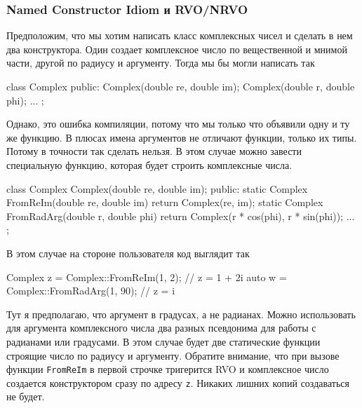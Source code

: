 \subsubsection{Named Constructor Idiom и RVO/NRVO}
\label{section::NamedCtorIdiom}

Предположим, что мы хотим написать класс комплексных чисел и сделать в нем два конструктора.
Один создает комплексное число по вещественной и мнимой части, другой по радиусу и аргументу.
Тогда мы бы могли написать так
\begin{cppcode}
class Complex {
public:
  Complex(double re, double im);
  Complex(double r, double phi);
  ...
};
\end{cppcode}
Однако, это ошибка компиляции, потому что мы только что объявили одну и ту же функцию.
В плюсах имена аргументов не отличают функции, только их типы.
Потому в точности так сделать нельзя.
В этом случае можно завести специальную функцию, которая будет строить комплексные числа.
\begin{cppcode}
class Complex {
  Complex(double re, double im);
public:
  static Complex FromReIm(double re, double im) {
    return Complex(re, im);
  }
  static Complex FromRadArg(double r, double phi) {
    return Complex(r * cos(phi), r * sin(phi));
  }
  ...
};
\end{cppcode}
В этом случае на стороне пользователя код выглядит так
\begin{cppcode}
Complex z = Complex::FromReIm(1, 2); // z = 1 + 2i
auto w = Complex::FromRadArg(1, 90); // z = i
\end{cppcode}
Тут я предполагаю, что аргумент в градусах, а не радианах.
Можно использовать для аргумента комплексного числа два разных псевдонима для работы с радианами или градусами.
В этом случае будет две статические функции строящие число по радиусу и аргументу.
Обратите внимание, что при вызове функции \verb"FromReIm" в первой строчке тригерится RVO и комплексное число создается конструктором сразу по адресу \verb"z".
Никаких лишних копий создаваться не будет.

